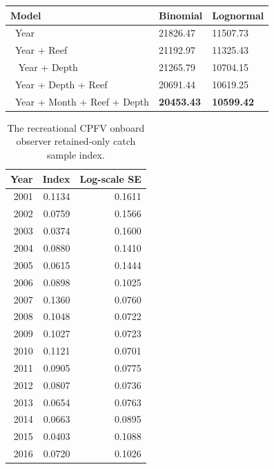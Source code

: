 \documentclass[12pt,]{article}
\begin{document}
\begin{table}[ht]
\begin{tabular}{lll}
  \hline
Model & Binomial & Lognormal \\ 
  \hline
~Year & 21826.47 & 11507.73 \\ 
  ~Year + Reef & 21192.97 & 11325.43 \\ 
  ~ Year + Depth & 21265.79 & 10704.15 \\ 
  ~Year + Depth + Reef & 20691.44 & 10619.25 \\ 
  ~Year + Month + Reef + Depth & \textbf{20453.43} & \textbf{10599.42} \\ 
   \hline
\end{tabular}
\end{table}\begin{table}[ht]
\centering
\caption{The recreational CPFV
                                            onboard observer retained-only
                                            catch sample index.} 
\label{tab:Fleet12_RecPC_onboard_index}
\begin{tabular}{rrr}
  \hline
Year & Index & Log-scale SE \\ 
  \hline
 2001 & 0.1134 & 0.1611 \\ 
   2002 & 0.0759 & 0.1566 \\ 
   2003 & 0.0374 & 0.1600 \\ 
   2004 & 0.0880 & 0.1410 \\ 
   2005 & 0.0615 & 0.1444 \\ 
   2006 & 0.0898 & 0.1025 \\ 
   2007 & 0.1360 & 0.0760 \\ 
   2008 & 0.1048 & 0.0722 \\ 
   2009 & 0.1027 & 0.0723 \\ 
   2010 & 0.1121 & 0.0701 \\ 
   2011 & 0.0905 & 0.0775 \\ 
   2012 & 0.0807 & 0.0736 \\ 
   2013 & 0.0654 & 0.0763 \\ 
   2014 & 0.0663 & 0.0895 \\ 
   2015 & 0.0403 & 0.1088 \\ 
   2016 & 0.0720 & 0.1026 \\ 
   \hline
\end{tabular}
\end{table}

\FloatBarrier
\end{document}
